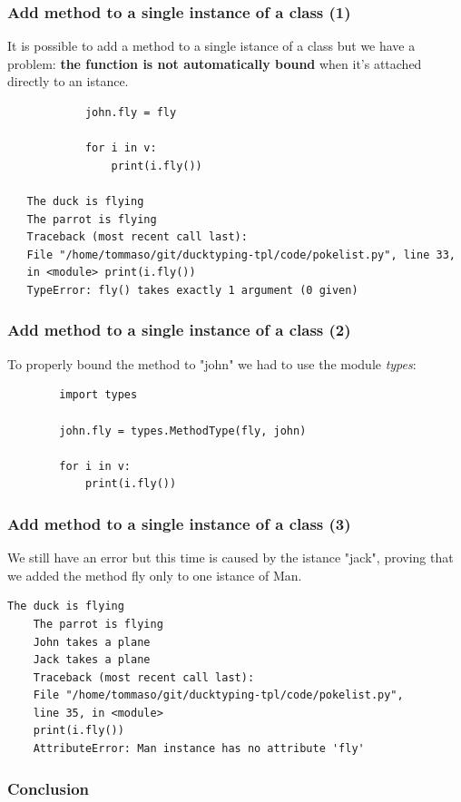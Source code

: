 \documentclass[xcolor ={table,usenames,dvipsnames}]{beamer}
\theoremstyle{definition}
\begin{document}
	\begin{frame}[fragile]
		\frametitle{Add method to a single instance of a class (1)}
			It is possible to add a method to a single istance of a class but we have a problem: \textbf{the function is not automatically bound} when it's attached directly to an istance.
			
				\begin{lstlisting}
			john.fly = fly
			
			for i in v:
				print(i.fly())
				
   The duck is flying
   The parrot is flying
   Traceback (most recent call last):
   File "/home/tommaso/git/ducktyping-tpl/code/pokelist.py", line 33, 
   in <module> print(i.fly())
   TypeError: fly() takes exactly 1 argument (0 given)
			\end{lstlisting}
	\end{frame}
	
	\begin{frame}[fragile]
		\frametitle{Add method to a single instance of a class (2)}
			
		To properly bound the method  to "john" we had to use the module \textit{types}:
		
		\begin{lstlisting}
		import types
		
		john.fly = types.MethodType(fly, john)
		
		for i in v:
			print(i.fly())
		\end{lstlisting}
	\end{frame}

	\begin{frame}[fragile]
		\frametitle{Add method to a single instance of a class (3)}
			We still have an error but this time is caused by the istance "jack", proving that we added the method fly only to one istance of Man. 
		
		\begin{lstlisting}[keywordstyle=\color{black},
		commentstyle=\color{black},
		stringstyle=\color{black}.]
	The duck is flying
	The parrot is flying
	John takes a plane
	Jack takes a plane
	Traceback (most recent call last):
	File "/home/tommaso/git/ducktyping-tpl/code/pokelist.py",
	line 35, in <module>
	print(i.fly())
	AttributeError: Man instance has no attribute 'fly'
		\end{lstlisting}
	\end{frame}

\begin{frame}
	\frametitle{Conclusion}
\end{frame}

	

		
	
	

	
	
	
	
	
	
	
	
	
	
	
\end{document}
